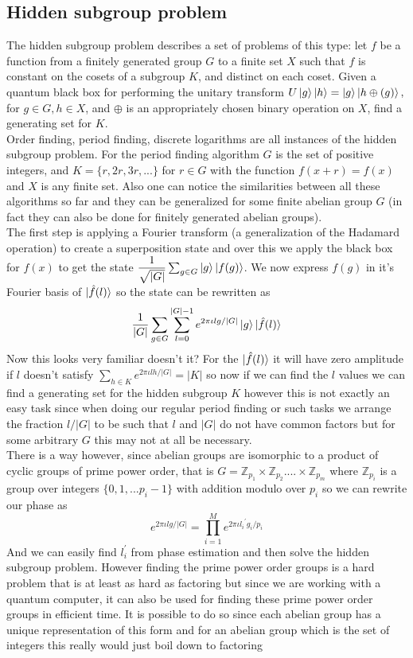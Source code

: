 \documentclass{report}
\begin{document}
\subsection{Hidden subgroup problem}
The hidden subgroup problem describes a set of problems of this type: let $f$ be a function from a finitely generated group $G$ to a finite set $X$ such that $f$ is constant on the cosets of a subgroup $K$, and distinct on each coset. Given a quantum black box for performing the unitary transform $U\ket{g}\ket{h} = \ket{g}\ket{h\oplus(g)},$ for $g \in G, h \in X$, and $\oplus$ is an appropriately chosen binary operation on $X$, find a generating set for $K$.\\
Order finding, period finding, discrete logarithms are all instances of the hidden subgroup problem. For the period finding algorithm $G$ is the set of positive integers, and $K = \{r,2r,3r,...\}$ for $r \in G$ with the function $f(x+r) = f(x)$ and $X$ is any finite set. Also one can notice the similarities between all these algorithms so far and they can be generalized for some finite abelian group $G$ (in fact they can also be done for finitely generated abelian groups).\\
The first step is applying a Fourier transform (a generalization of the Hadamard operation) to create a superposition state and over this we apply the black box for $f(x)$ to get the state $\dfrac{1}{\sqrt{|G|}}\sum_{g\in{G}}\ket{g}\ket{f(g)}$. We now express $f(g)$ in it's Fourier basis of $\ket{\hat{f}(l)}$ so the state can be rewritten as 
$$\dfrac{1}{|G|}\sum_{g\in{G}}\sum_{l=0}^{|G|-1}e^{2\pi\iota{lg}/|G|}\ket{g}\ket{\hat{f}(l)}$$
Now this looks very familiar doesn't it? For the $\ket{\hat{f}(l)}$ it will have zero amplitude if $l$ doesn't satisfy $\sum_{h\in{K}}e^{2\pi\iota{lh}/|G|} = |K|$ so now if we can find the $l$ values we can find a generating set for the hidden subgroup $K$ however this is not exactly an easy task since when doing our regular period finding or such tasks we arrange the fraction $l/|G|$ to be such that $l$ and $|G|$ do not have common factors but for some arbitrary $G$ this may not at all be necessary.\\
There is a way however, since abelian groups are isomorphic to a product of cyclic groups of prime power order, that is $G = \mathbb{Z}_{p_1} \times \mathbb{Z}_{p_2} ....\times \mathbb{Z}_{p_m}$ where $\mathbb{Z}_{p_i}$ is a group over integers $\{0,1,...{p_i-1}\}$ with addition modulo over $p_i$ so we can rewrite our phase as
$$e^{2\pi\iota{lg}/|G|} = \prod_{i=1}^{M}e^{2\pi\iota{{l_i}^{'}g_i}/{p_i}}$$
And we can easily find $l_{i}^{'}$ from phase estimation and then solve the hidden subgroup problem. However finding the prime power order groups is a hard problem that is at least as hard as factoring but since we are working with a quantum computer, it can also be used for finding these prime power order groups in efficient time. It is possible to do so since each abelian group has a unique representation of this form and for an abelian group which is the set of integers this really would just boil down to factoring
\end{document}
